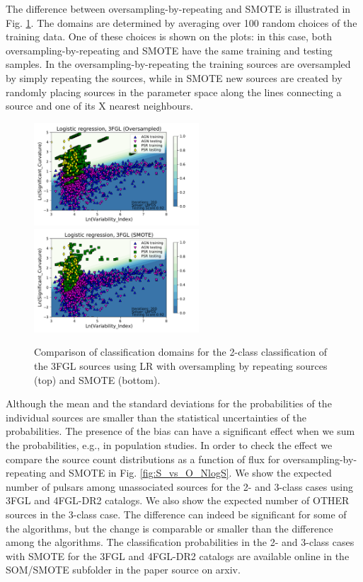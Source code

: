 The difference between oversampling-by-repeating and SMOTE is illustrated in Fig. \ref{fig:domains_smote_over}.
The domains are determined by averaging over 100 random choices of the training data.
One of these choices is shown on the plots: in this case, both oversampling-by-repeating and SMOTE have the same 
training and testing samples.
In the oversampling-by-repeating the training sources are oversampled by simply repeating the sources,
while in SMOTE new sources are created by randomly placing sources in the parameter space along the lines connecting a source
and one of its X  nearest neighbours.


\begin{figure}[h]
\centering
\includegraphics[width=0.55\textwidth]{plots/classification_domains/domains_oversampled_LR_3FGL_2class.pdf}
\includegraphics[width=0.55\textwidth]{plots/classification_domains/domains_smote_LR_3FGL_2class.pdf}
\caption{Comparison of classification domains for the 2-class classification of the 3FGL sources
using LR with oversampling by repeating sources (top) and SMOTE (bottom).
}
\label{fig:domains_smote_over}
\end{figure}


Although the mean and the standard deviations for the probabilities of the individual sources are smaller than the 
statistical uncertainties of the probabilities. 
The presence of the bias can have a significant effect when we sum the probabilities, e.g., in population studies.
In order to check the effect we compare the source count distributions as a function of flux for oversampling-by-repeating and SMOTE 
in Fig. \ref{fig:S_vs_O_NlogS}.
We show the expected number of pulsars among unassociated sources for the 2- and 3-class cases using 3FGL and 4FGL-DR2 catalogs.
We also show the expected number of OTHER sources in the 3-class case.
The difference can indeed be significant for some of the algorithms, but the change is comparable or smaller than the difference among the algorithms.
The classification probabilities in the 2- and 3-class cases with SMOTE for the 3FGL and 4FGL-DR2 catalogs 
are available online in the SOM/SMOTE subfolder in the paper source on arxiv.

